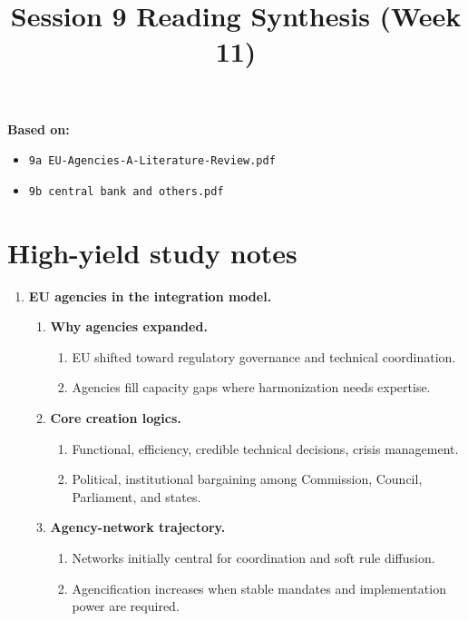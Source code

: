 \documentclass[12pt]{article}
\title{Session 9 Reading Synthesis (Week 11)}
\date{}
\begin{document}
\maketitle

\noindent\textbf{Based on:}
\begin{itemize}
    \item \texttt{9a EU-Agencies-A-Literature-Review.pdf}
    \item \texttt{9b central bank and others.pdf}
\end{itemize}

\section*{High-yield study notes}

\begin{enumerate}[label=\Roman*.]
    \item \textbf{EU agencies in the integration model.}
    \begin{enumerate}[label=\Alph*.]
        \item \textbf{Why agencies expanded.}
        \begin{enumerate}
            \item EU shifted toward regulatory governance and technical coordination.
            \item Agencies fill capacity gaps where harmonization needs expertise.
        \end{enumerate}
        \item \textbf{Core creation logics.}
        \begin{enumerate}
            \item Functional, efficiency, credible technical decisions, crisis management.
            \item Political, institutional bargaining among Commission, Council, Parliament, and states.
        \end{enumerate}
        \item \textbf{Agency-network trajectory.}
        \begin{enumerate}
            \item Networks initially central for coordination and soft rule diffusion.
            \item Agencification increases when stable mandates and implementation power are required.
        \end{enumerate}
    \end{enumerate}


\end{enumerate}
\end{document}
